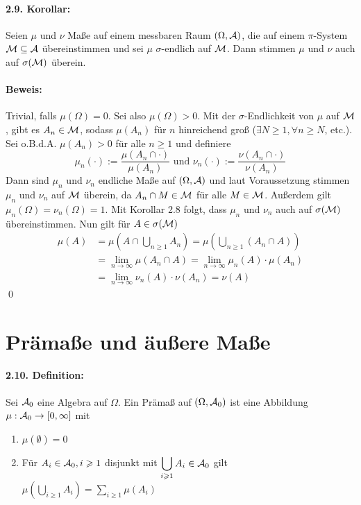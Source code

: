 \documentclass[12pt]{report}
\begin{document}
\paragraph{2.9. Korollar:}Seien $\mu$ und $\nu$ Ma\ss{}e auf einem messbaren Raum $(\Omega,\mathcal{A})$, die auf einem $\pi$-System $\mathcal{M}\subseteq\mathcal{A}$ \"ubereinstimmen und sei $\mu$ $\sigma$-endlich auf $\mathcal{M}$. Dann stimmen $\mu$ und $\nu$ auch auf $\sigma(\mathcal{M})$ \"uberein. 

\paragraph{Beweis:}Trivial, falls $\mu(\Omega)=0$. Sei also $\mu(\Omega)>0$. Mit der $\sigma$-Endlichkeit von $\mu$ auf $\mathcal{M}$, gibt es $A_n\in\mathcal{M}$, sodass $\mu(A_n)$ f\"ur $n$ hinreichend gro\ss{} ($\exists N\geq1,\forall n\geq N$, etc.). Sei o.B.d.A. $\mu(A_n)>0$ f\"ur alle $n\geq1$ und definiere
$$\mu_n(\cdot):=\dfrac{\mu(A_n\cap\cdot)}{\mu(A_n)}\text{ und }\nu_n(\cdot):=\dfrac{\nu(A_n\cap\cdot)}{\nu(A_n)}$$
Dann sind $\mu_n$ und $\nu_n$ endliche Ma\ss{}e auf $(\Omega,\mathcal{A})$ und laut Voraussetzung stimmen $\mu_n$ und $\nu_n$ auf $\mathcal{M}$ \"uberein, da $A_n\cap M\in\mathcal{M}$ f\"ur alle $M\in\mathcal{M}$. Au\ss{}erdem gilt $\mu_n(\Omega)=\nu_n(\Omega)=1$. Mit Korollar 2.8 folgt, dass $\mu_n$ und $\nu_n$ auch auf $\sigma(\mathcal{M})$ \"ubereinstimmen. Nun gilt f\"ur $A\in\sigma(\mathcal{M})$
\begin{align*}
    \mu(A)&=\mu\left(A\cap\bigcup_{n\geq1}A_n\right)=\mu\left(\bigcup_{n\geq1}(A_n\cap A)\right)\\
    &=\lim_{n\to\infty}\mu(A_n\cap A)=\lim_{n\to\infty}\mu_n(A)\cdot\mu(A_n)\\
    &=\lim_{n\to\infty}\nu_n(A)\cdot\nu(A_n)=\nu(A)
\end{align*}
\qed

\section*{Pr\"ama\ss{}e und \"au\ss{}ere Ma\ss{}e}

\paragraph{2.10. Definition:}Sei $\mathcal{A}_0$ eine Algebra auf $\Omega$. Ein Pr\"ama\ss{} auf $(\Omega,\mathcal{A}_0)$ ist eine Abbildung $\mu:\nobreak\mathcal{A}_0\to\nobreak [0,\infty]$ mit
\begin{enumerate}[label=(\roman*)]
    \item $\mu(\emptyset)=0$
    \item F\"ur $A_i\in\mathcal{A}_0,i\geqslant1$ disjunkt mit $\displaystyle\bigcup_{i\geqslant1}A_i\in\mathcal{A}_0$ gilt $\displaystyle\mu\left(\bigcup_{i\geq1}A_i\right)=\sum_{i\geq1}\mu(A_i)$
\end{enumerate}
\end{document}
